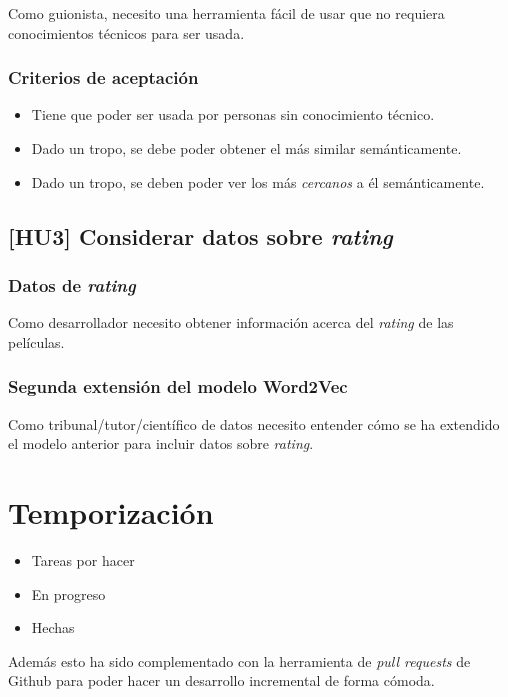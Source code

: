 Como guionista, necesito una herramienta
fácil de usar que no requiera conocimientos técnicos para ser usada.

\subsubsection{Criterios de aceptación}

\begin{itemize}
      \item Tiene que poder ser usada por personas sin conocimiento técnico.
      \item Dado un tropo, se debe poder obtener el más similar semánticamente.
      \item Dado un tropo, se deben poder ver los más \textit{cercanos} a él semánticamente.
\end{itemize}

\subsection{[HU3] Considerar datos sobre \textit{rating}}\label{uc:word2vec_rating}

\subsubsection{Datos de \textit{rating}}\label{uc:rating_data}

Como desarrollador necesito obtener información acerca del \textit{rating}
de las películas.

\subsubsection{Segunda extensión del modelo Word2Vec}\label{uc:word2vec_segunda_extension}

Como tribunal/tutor/científico de datos
necesito entender cómo se ha extendido el modelo anterior para incluir datos sobre \textit{rating}.

\section{Temporización}
\begin{itemize}
    \item Tareas por hacer
    \item En progreso
    \item Hechas
\end{itemize}

Además esto ha sido complementado con la herramienta de \textit{pull requests} de Github para poder hacer
un desarrollo incremental de forma cómoda.
